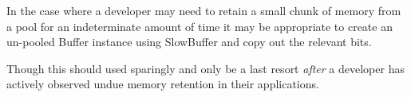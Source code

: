 In the case where a developer may need to retain a small chunk of memory
from a pool for an indeterminate amount of time it may be appropriate to
create an un-pooled Buffer instance using SlowBuffer and copy out the
relevant bits.

\begin{Shaded}
\begin{Highlighting}[]
 

\NormalTok{(}\NormalTok{, }\NormalTok{() \{}
   \NormalTok{();}
    \NormalTok{(}\NormalTok{);}
  \NormalTok{, }\NormalTok{, }\NormalTok{);}
\NormalTok{\});}
\end{Highlighting}
\end{Shaded}

Though this should used sparingly and only be a last resort \emph{after}
a developer has actively observed undue memory retention in their
applications.
